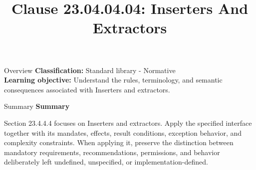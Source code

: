 \documentclass[10pt,letterpaper]{article}
\title{Clause 23.04.04.04: Inserters And Extractors}
\author{}
\date{}
\begin{document}
\maketitle
\begin{CornellOverviewBox}{Overview}
\textbf{Classification:} Standard library - Normative\\[2pt]
\textbf{Learning objective:} Understand the rules, terminology, and semantic consequences associated with Inserters and extractors.
\end{CornellOverviewBox}\begin{CornellSummaryBox}{Summary}
{\sffamily\bfseries\color{Accent} Summary}\par\vspace{3pt}Section 23.4.4.4 focuses on Inserters and extractors. Apply the specified interface together with its mandates, effects, result conditions, exception behavior, and complexity constraints. When applying it, preserve the distinction between mandatory requirements, recommendations, permissions, and behavior deliberately left undefined, unspecified, or implementation-defined.
\end{CornellSummaryBox}
\end{document}
